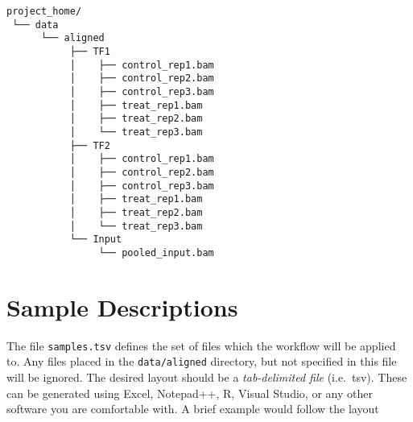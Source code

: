 \documentclass[
]{book}
\begin{document}
\begin{verbatim}
project_home/
 └── data
      └── aligned 
           ├── TF1 
           │    ├── control_rep1.bam
           │    ├── control_rep2.bam
           │    ├── control_rep3.bam
           │    ├── treat_rep1.bam
           │    ├── treat_rep2.bam
           │    └── treat_rep3.bam
           ├── TF2 
           │    ├── control_rep1.bam
           │    ├── control_rep2.bam
           │    ├── control_rep3.bam
           │    ├── treat_rep1.bam
           │    ├── treat_rep2.bam
           │    └── treat_rep3.bam           
           └── Input
                └── pooled_input.bam 
\end{verbatim}

\hypertarget{sample-descriptions}{%
\section{Sample Descriptions}\label{sample-descriptions}}

The file \texttt{samples.tsv} defines the set of files which the workflow will be applied to.
Any files placed in the \texttt{data/aligned} directory, but not specified in this file will be ignored.
The desired layout should be a \emph{tab-delimited file} (i.e.~tsv).
These can be generated using Excel, Notepad++, R, Visual Studio, or any other software you are comfortable with.
A brief example would follow the layout
\end{document}
